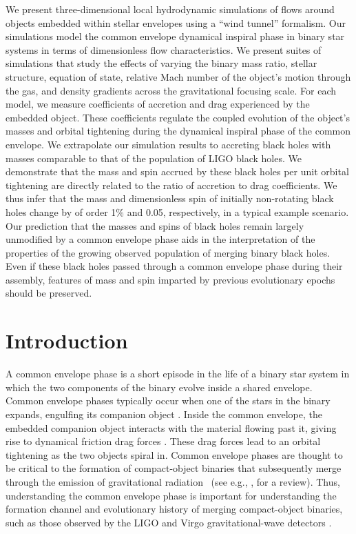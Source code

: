 We present three-dimensional local hydrodynamic simulations of flows around objects embedded within stellar envelopes using a ``wind tunnel'' formalism. Our simulations model the common envelope dynamical inspiral phase in binary star systems in terms of dimensionless flow characteristics. We present suites of simulations that study the effects of varying the binary mass ratio, stellar structure, equation of state, relative Mach number of the object's motion through the gas, and density gradients across the gravitational focusing scale. For each model, we measure coefficients of accretion and drag experienced by the embedded object. These coefficients regulate the coupled evolution of the object's masses and orbital tightening during the dynamical inspiral phase of the common envelope. We extrapolate our simulation results to accreting black holes with masses comparable to that of the population of LIGO black holes. We demonstrate that the mass and spin accrued by these black holes per unit orbital tightening are directly related to the ratio of accretion to drag coefficients. We thus infer that the mass and dimensionless spin of initially non-rotating black holes change by of order 1\% and 0.05, respectively, in a typical example scenario. Our prediction that the masses and spins of black holes remain largely unmodified by a common envelope phase aids in the interpretation of the properties of the growing observed population of merging binary black holes. Even if these black holes passed through a common envelope phase during their assembly, features of mass and spin imparted by previous evolutionary epochs should be preserved. 

\section{Introduction} \label{sec:intro}
A common envelope phase is a short episode in the life of a binary star system in which the two components of the binary evolve inside a shared envelope. Common envelope phases typically occur when one of the stars in the binary expands, engulfing its companion object \cite{Paczynski:1976,1978ApJ...222..269T,1993PASP..105.1373I,2010NewAR..54...65T,2013A&ARv..21...59I,2017PASA...34....1D}. Inside the common envelope, the embedded companion object interacts with the material flowing past it, giving rise to dynamical friction drag forces \cite{1943ApJ....97..255C,1999ApJ...513..252O}. These drag forces lead to an orbital tightening as the two objects spiral in. 
Common envelope phases are thought to be critical to the formation of compact-object binaries that subsequently merge through the emission of gravitational radiation~\cite{Heuvel:1976,Smarr:1976} (see e.g., \cite{Mandel:2018hfr}, for a review). Thus, understanding the common envelope phase is important for understanding the formation channel and evolutionary history of merging compact-object binaries, such as those observed by the LIGO and Virgo gravitational-wave detectors \cite{TheLIGOScientific:2014jea, TheVirgo:2014hva}.

